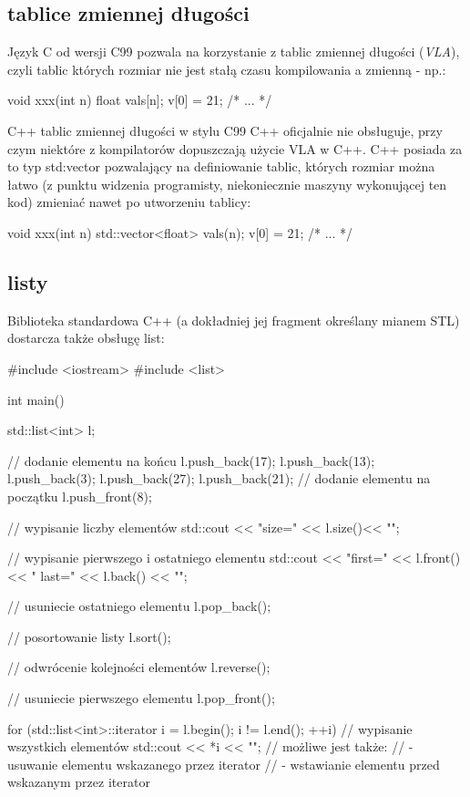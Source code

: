 \subsection{tablice zmiennej długości}

Język C od wersji C99 pozwala na korzystanie z tablic zmiennej długości (\textit{VLA}), czyli tablic których rozmiar nie jest stałą czasu kompilowania a zmienną - np.:

\begin{CodeFrame*}[c]{}
void xxx(int n) {
    float vals[n];
    v[0] = 21;
    /* ... */
}
\end{CodeFrame*}

C++ tablic zmiennej długości w stylu C99 C++ oficjalnie nie obsługuje, przy czym niektóre z kompilatorów dopuszczają użycie VLA w C++.
C++ posiada za to typ std:vector pozwalający na definiowanie tablic, których rozmiar można łatwo (z punktu widzenia programisty, niekoniecznie maszyny wykonującej ten kod) zmieniać nawet po utworzeniu tablicy:
\begin{CodeFrame*}[cpp]{}
void xxx(int n) {
    std::vector<float> vals(n);
    v[0] = 21;
    /* ... */
}
\end{CodeFrame*}


\subsection{listy}

Biblioteka standardowa C++ (a dokładniej jej fragment określany mianem STL) dostarcza także obsługę list:

\begin{CodeFrame*}[cpp]{}
#include <iostream>
#include <list>

int main() {
    std::list<int> l;
    
    // dodanie elementu na końcu
    l.push_back(17);
    l.push_back(13);
    l.push_back(3);
    l.push_back(27);
    l.push_back(21);
    // dodanie elementu na początku
    l.push_front(8);
    
    // wypisanie liczby elementów
    std::cout << "size=" << l.size()<< "\n";
    
    // wypisanie pierwszego i ostatniego elementu
    std::cout << "first=" << l.front() << " last=" << l.back() << "\n";
    
    // usuniecie ostatniego elementu
    l.pop_back();
    
    // posortowanie listy
    l.sort();
    
    // odwrócenie kolejności elementów
    l.reverse();
    
    // usuniecie pierwszego elementu
    l.pop_front();
    
    for (std::list<int>::iterator i = l.begin(); i != l.end(); ++i) {
        // wypisanie wszystkich elementów
        std::cout << *i << "\n";
        // możliwe jest także:
        //  - usuwanie elementu wskazanego przez iterator
        //  - wstawianie elementu przed wskazanym przez iterator
    }
}
\end{CodeFrame*}

